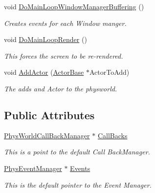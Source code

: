 \begin{DoxyCompactItemize}
void \hyperlink{classPhysWorld_ae81bab7f314d98f7b787c508e60c9c9a}{DoMainLoopWindowManagerBuffering} ()
\begin{DoxyCompactList}\small\item\em Creates events for each Window manger. \item\end{DoxyCompactList}\item 
void \hyperlink{classPhysWorld_a8f33541d67164a2452e568443e9905be}{DoMainLoopRender} ()
\begin{DoxyCompactList}\small\item\em This forces the screen to be re-\/rendered. \item\end{DoxyCompactList}\item 
void \hyperlink{classPhysWorld_ae490054b3e1c4c5aa69cb8e3b7bd2f29}{AddActor} (\hyperlink{classActorBase}{ActorBase} $\ast$ActorToAdd)
\begin{DoxyCompactList}\small\item\em The adds and Actor to the physworld. \item\end{DoxyCompactList}\end{DoxyCompactItemize}
\subsection*{Public Attributes}
\begin{DoxyCompactItemize}
\item 
\hyperlink{classPhysWorldCallBackManager}{PhysWorldCallBackManager} $\ast$ \hyperlink{classPhysWorld_a080ea6f1584374b07d3c1f29c7ed64df}{CallBacks}
\begin{DoxyCompactList}\small\item\em This is a point to the default Call BackManager. \item\end{DoxyCompactList}\item 
\hyperlink{classPhysEventManager}{PhysEventManager} $\ast$ \hyperlink{classPhysWorld_a601b3c6093aaf2a69fcd3311dde9aadc}{Events}
\begin{DoxyCompactList}\small\item\em This is the default pointer to the Event Manager. \item\end{DoxyCompactList}\end{DoxyCompactItemize}
